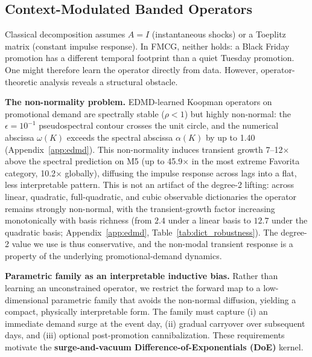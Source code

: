 \documentclass[10pt]{article} %
\theoremstyle{plain}
\theoremstyle{definition}
\begin{document}
\subsection{Context-Modulated Banded Operators}

Classical decomposition assumes $A = I$ (instantaneous shocks) or a Toeplitz matrix (constant impulse response). In FMCG, neither holds: a Black Friday promotion has a different temporal footprint than a quiet Tuesday promotion. One might therefore learn the operator directly from data. However, operator-theoretic analysis reveals a structural obstacle.

\textbf{The non-normality problem.} EDMD-learned Koopman operators on promotional demand are spectrally stable ($\rho < 1$) but highly non-normal: the $\epsilon=10^{-1}$ pseudospectral contour crosses the unit circle, and the numerical abscissa $\omega(K)$ exceeds the spectral abscissa $\alpha(K)$ by up to 1.40 (Appendix~\ref{app:edmd}). This non-normality induces transient growth 7--12$\times$ above the spectral prediction on M5 (up to 45.9$\times$ in the most extreme Favorita category, 10.2$\times$ globally), diffusing the impulse response across lags into a flat, less interpretable pattern. This is not an artifact of the degree-2 lifting: across linear, quadratic, full-quadratic, and cubic observable dictionaries the operator remains strongly non-normal, with the transient-growth factor increasing monotonically with basis richness (from $2.4$ under a linear basis to $12.7$ under the quadratic basis; Appendix~\ref{app:edmd}, Table~\ref{tab:dict_robustness}). The degree-2 value we use is thus conservative, and the non-modal transient response is a property of the underlying promotional-demand dynamics.

\textbf{Parametric family as an interpretable inductive bias.} Rather than learning an unconstrained operator, we restrict the forward map to a low-dimensional parametric family that avoids the non-normal diffusion, yielding a compact, physically interpretable form. The family must capture (i) an immediate demand surge at the event day, (ii) gradual carryover over subsequent days, and (iii) optional post-promotion cannibalization. These requirements motivate the \textbf{surge-and-vacuum Difference-of-Exponentials (DoE)} kernel.
\end{document}

